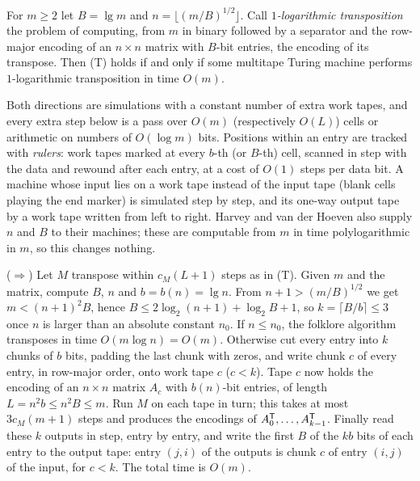\begin{proposition}\label{prop:entry-width}
\notformalized
For $m\ge2$ let $B=\lg m$ and $n=\lfloor(m/B)^{1/2}\rfloor$. Call \emph{$1$-logarithmic transposition} the
problem of computing, from $m$ in binary followed by a separator and the row-major encoding of an $n\times n$
matrix with $B$-bit entries, the encoding of its transpose. Then (T) holds if and only if some multitape
Turing machine performs $1$-logarithmic transposition in time $O(m)$.
\end{proposition}

\begin{informalproof}
Both directions are simulations with a constant number of extra work tapes, and every extra step below is a
pass over $O(m)$ (respectively $O(L)$) cells or arithmetic on numbers of $O(\log m)$ bits. Positions within an
entry are tracked with \emph{rulers}: work tapes marked at every $b$-th (or $B$-th) cell, scanned in step with
the data and rewound after each entry, at a cost of $O(1)$ steps per data bit. A machine whose input lies on a
work tape instead of the input tape (blank cells playing the end marker) is simulated step by step, and its
one-way output tape by a work tape written from left to right. Harvey and van der Hoeven also supply $n$ and
$B$ to their machines; these are computable from $m$ in time polylogarithmic in $m$, so this changes nothing.

($\Rightarrow$) Let $M$ transpose within $c_M(L+1)$ steps as in (T). Given $m$ and the matrix, compute $B$,
$n$ and $b=b(n)=\lg n$. From $n+1>(m/B)^{1/2}$ we get $m<(n+1)^2B$, hence $B\le2\log_2(n+1)+\log_2B+1$,
so $k=\lceil B/b\rceil\le3$ once $n$ is larger than an absolute constant $n_0$. If $n\le n_0$, the folklore
algorithm transposes in time $O(m\log n)=O(m)$. Otherwise cut every entry into $k$ chunks of $b$ bits,
padding the last chunk with zeros, and write chunk $c$ of every entry, in row-major order, onto work tape
$c$ ($c<k$). Tape $c$ now holds the encoding of an $n\times n$ matrix $A_c$ with $b(n)$-bit entries, of
length $L=n^2b\le n^2B\le m$. Run $M$ on each tape in turn; this takes at most $3c_M(m+1)$ steps and
produces the encodings of $A_0^{\mathsf{T}},\dots,A_{k-1}^{\mathsf{T}}$. Finally read these $k$ outputs in step, entry by
entry, and write the first $B$ of the $kb$ bits of each entry to the output tape: entry $(j,i)$ of the
outputs is chunk $c$ of entry $(i,j)$ of the input, for $c<k$. The total time is $O(m)$.


\end{informalproof}
